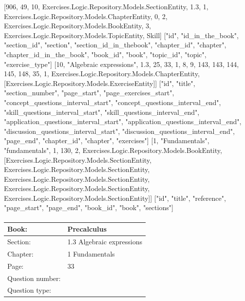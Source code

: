 \documentclass{article}
\begin{document}
    [906, 49, 10, Exercises.Logic.Repository.Models.SectionEntity, 1.3, 1, Exercises.Logic.Repository.Models.ChapterEntity, 0, 2, Exercises.Logic.Repository.Models.BookEntity, 3, Exercises.Logic.Repository.Models.TopicEntity, Skill]
    ["id", "id_in_the_book", "section_id", "section", "section_id_in_thebook", "chapter_id", "chapter", "chapter_id_in_the_book", "book_id", "book", "topic_id", "topic", "exercise_type"]
    [10, "Algebraic expressions", 1.3, 25, 33, 1, 8, 9, 143, 143, 144, 145, 148, 35, 1, Exercises.Logic.Repository.Models.ChapterEntity, [Exercises.Logic.Repository.Models.ExerciseEntity]]
    ["id", "title", "section_number", "page_start", "page_exercises_start", "concept_questions_interval_start", "concept_questions_interval_end", "skill_questions_interval_start", "skill_questions_interval_end", "application_questions_interval_start", "application_questions_interval_end", "discussion_questions_interval_start", "discussion_questions_interval_end", "page_end", "chapter_id", "chapter", "exercises"]
    [1, "Fundamentals", "fundamentals", 1, 130, 2, Exercises.Logic.Repository.Models.BookEntity, [Exercises.Logic.Repository.Models.SectionEntity, Exercises.Logic.Repository.Models.SectionEntity, Exercises.Logic.Repository.Models.SectionEntity, Exercises.Logic.Repository.Models.SectionEntity, Exercises.Logic.Repository.Models.SectionEntity]]
    ["id", "title", "reference", "page_start", "page_end", "book_id", "book", "sections"]

   \paragraph{}
   \begin{tabularx}{1\textwidth}{
           p{}
           p{}
       }
       \toprule
       Book: & Precalculus
       \\
       \midrule
       Section: & 1.3 Algebraic expressions
       \\
       \midrule
       Chapter: & 1 Fundamentals
       \\
       \midrule
       Page: & 33
       \\
       \midrule
       Question number: & 
       \\
       \midrule
       Question type: & 
       \\
       \bottomrule
   \end{tabularx}
\end{document}
